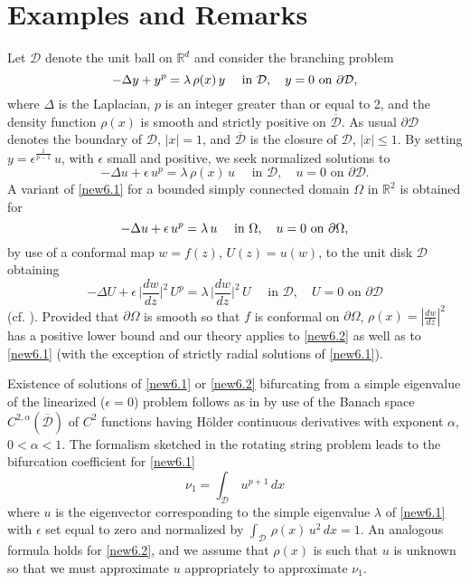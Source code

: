 \documentclass[final]{siamltex}
\numberwithin{equation}{section}
\begin{document}
\section{Examples and Remarks}
Let $\mathcal{D}$ denote the unit ball on ${\mathbb{R}}^d$ and consider the branching problem
\begin{equation} \notag
-\Delta y + y^{p}  = \lambda \, \rho(x) \, y \quad \text{ in } \mathcal{D}, \quad y =0 \text{ on } \partial \mathcal{D},
\end{equation}
where $\Delta$ is the Laplacian, $p$ is an integer greater than or equal to 2, and the density function $\rho(x)$ is smooth and strictly positive on $\overline{\mathcal{D}}$. As usual $\partial \mathcal{D}$ denotes the boundary of $\mathcal{D}$, $|x|=1$, and
$\overline{\mathcal{D}}$ is the closure of $\mathcal{D}$, $|x|\le 1$. By setting $y=\epsilon^{\frac{1}{p-1}} \, u$, with $\epsilon$ small and positive, we seek normalized solutions to
\begin{equation} \label{new6.1}
-\Delta u + \epsilon \, u^{p}  = \lambda \, \rho(x) \, u \quad \text{ in } \mathcal{D}, \quad  u =0 \text{ on } \partial \mathcal{D}.
\end{equation}
A variant of \eqref{new6.1} for a bounded simply connected domain $\Omega$ in ${\mathbb{R}}^2$ is obtained for
\begin{equation} \notag
-\Delta u + \epsilon \, u^{p}  = \lambda \, u \quad \text{ in } \Omega, \quad u =0 \text{ on } \partial \Omega,
\end{equation}
by use of a conformal map $w=f(z)$, $U(z)=u(w)$, to the unit disk $\mathcal{D}$ obtaining
\begin{equation} \label{new6.2}
-\Delta U + \epsilon \, \Big|\frac{dw}{dz}\Big|^2 \, U^{p}  = \lambda \, \Big|\frac{dw}{dz}\Big|^2 \, U \quad \text{ in } \mathcal{D}, \quad U =0 \text{ on } \partial \mathcal{D}
\end{equation}
(cf. \cite{Kuttler-Sigillito}). Provided that $\partial \Omega$ is smooth so that $f$ is conformal on $\partial \Omega$, $\rho(x)=|\frac{dw}{dz}|^2$ has a positive lower bound and our theory applies to \eqref{new6.2} as well as to \eqref{new6.1} (with the exception of strictly radial solutions of \eqref{new6.1}).

Existence of solutions of \eqref{new6.1} or \eqref{new6.2} bifurcating from a simple eigenvalue of the linearized ($\epsilon=0$) problem follows as in \cite{Sattinger}
by use of the Banach space $C^{2, \alpha}(\overline{\mathcal{D}})$ of $C^2$ functions having H\"older continuous derivatives with exponent $\alpha$, $0<\alpha<1$. The formalism sketched in the rotating string problem leads to the bifurcation coefficient for \eqref{new6.1}
\begin{equation} \label{new6.3}
\nu_1=\displaystyle{\int_{\mathcal{D}} \, u^{p+1} \, dx}
\end{equation}
where $u$ is the eigenvector corresponding to the simple eigenvalue $\lambda$ of \eqref{new6.1} with $\epsilon$ set equal to zero and normalized by $\int_{\mathcal{D}} \, \rho(x) \, u^{2} \, dx=1$. An analogous formula holds for \eqref{new6.2}, and we assume that $\rho(x)$ is such that $u$ is unknown so that we must approximate $u$ appropriately to approximate $\nu_1$.
\end{document}
